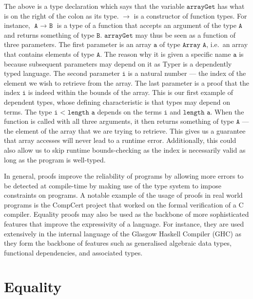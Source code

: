 \documentclass[12pt,twoside,maitrise]{dms}
\theoremstyle{definition}
\numberwithin{equation}{section}
\numberwithin{table}{chapter}
\numberwithin{figure}{chapter}
\newcommand\id[1] {\texttt{#1}}
\newcommand\fn[1] {\texttt{#1}}
\begin{document}
The above is a type declaration which says that the variable $\fn{arrayGet}$ has
what is on the right of the colon as its type. $\rightarrow$ is a constructor of
function types. For instance, $\fn{A $\rightarrow$ B}$ is a type of a function
that accepts an argument of the type $\fn{A}$ and returns something of type
$\fn{B}$. $\fn{arrayGet}$ may thus be seen as a function of three parameters.
The first parameter is an array $\fn{a}$ of type $\fn{Array A}$, i.e.\ an array
that contains elements of type $\fn{A}$. The reason why it is given a specific
name $\fn{a}$ is because subsequent parameters may depend on it as Typer is a
dependently typed language. The second parameter $\fn{i}$ is a natural number
--- the index of the element we wish to retrieve from the array. The last
parameter is a proof that the index $\id{i}$ is indeed within the bounds of the
array. This is our first example of dependent types, whose defining
characteristic is that types may depend on terms. The type $\fn{i < length a}$
depends on the terms $\fn{i}$ and $\fn{length a}$. When the function is called
with all three arguments, it then returns something of type $\fn{A}$ --- the
element of the array that we are trying to retrieve. This gives us a guarantee
that array accesses will never lead to a runtime error. Additionally, this could
also allow us to skip runtime bounds-checking as the index is necessarily valid
as long as the program is well-typed.

In general, proofs improve the reliability of programs by allowing more errors
to be detected at compile-time by making use of the type system to impose
constraints on programs. A notable example of the usage of proofs in real world
programs is the CompCert project that worked on the formal verification of a C
compiler\cite{Leroy-Compcert-CACM}. Equality proofs may also be used as the
backbone of more sophisticated features that improve the expressivity of a
language. For instance, they are used extensively in the internal language of
the Glasgow Haskell Compiler (GHC) as they form the backbone of features such as
generalised algebraic data types, functional dependencies, and associated
types\cite{sulzmann2007systemfeq}.

\section{Equality}

\end{document}
